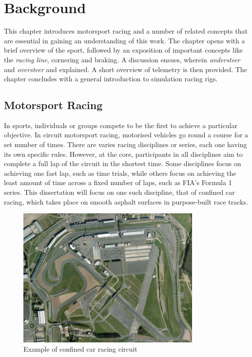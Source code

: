 \chapter{Background}
\label{sec:background}

This chapter introduces motorsport racing and a number of related concepts that are essential in gaining an understanding of this work. The chapter opens with a brief overview of the sport, followed by an exposition of important concepts like the \emph{racing line}, cornering and braking. A discussion ensues, wherein \emph{understeer} and \emph{oversteer} and explained. A short overview of telemetry is then provided. The chapter concludes with a general introduction to simulation racing rigs.

\section{Motorsport Racing}
In sports, individuals or groups compete to be the first to achieve a particular objective. In circuit motorsport racing, motorised vehicles go round a course for a set number of times. There are varies racing disciplines or series, each one having its own specific rules. However, at the core, participants in all disciplines aim to complete a full lap of the circuit in the shortest time. Some disciplines focus on achieving one fast lap, such as time trials, while others focus on achieving the least amount of time across a fixed number of laps, such as FIA's Formula 1 series. This dissertation will focus on one such discipline, that of confined car racing, which takes place on smooth asphalt surfaces in purpose-built race tracks. 

\begin{figure}[!htb]
	\centering
	\includegraphics[height=7cm]{images/confinedCircuit}
	\caption{Example of confined car racing circuit}
	\label{fig:circuit-overhead}
\end{figure}

